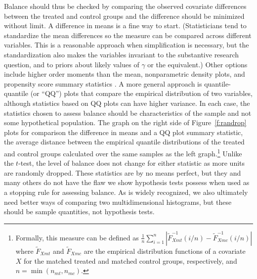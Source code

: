 \documentclass[11pt,titlepage]{article}
\begin{document}
Balance should thus be checked by comparing the observed covariate
differences between the treated and control groups and the difference
should be minimized without limit.  A difference in means is a fine
way to start.  (Statisticians tend to standardize the mean differences
so the measure can be compared across different variables.  This is a
reasonable approach when simplification is necessary, but the
standardization also makes the variables invariant to the substantive
research question, and to priors about likely values of $\gamma$ or
the equivalent.) Other options include higher order moments than the
mean, nonparametric density plots, and propensity score summary
statistics \citep{AusMam06, Hansen04, Rubin01}. A more general
approach is quantile-quantile (or ``QQ'') plots that compare the
empirical distribution of two variables, although statistics based on
QQ plots can have higher variance.  In each case, the statistics
chosen to assess balance should be characteristics of the sample and
not some hypothetical population.  The graph on the right side of
Figure~\ref{f:randrop} plots for comparison the difference in means
and a QQ plot summary statistic, the average distance between the
empirical quantile distributions of the treated and control groups
calculated over the same samples as the left graph.\footnote{Formally,
  this measure can be defined as $\frac{1}{n} \sum_{i=1}^n
  |\widetilde{F}_{Xmt}^{-1}(i/n) - \widetilde{F}^{-1}_{Xmc}(i/n)|$
  where $\widetilde{F}_{Xmt}$ and $\widetilde{F}_{Xmc}$ are the
  empirical distribution functions of a covariate $X$ for the matched
  treated and matched control groups, respectively, and
  $n=\min(n_{mt},n_{mc})$.}  Unlike the $t$-test, the level of balance
does not change for either statistic as more units are randomly
dropped.  These statistics are by no means perfect, but they and many
others do not have the flaw we show hypothesis tests possess when used
as a stopping rule for assessing balance.  As is widely recognized, we
also ultimately need better ways of comparing two multidimensional
histograms, but these should be sample quantities, not hypothesis
tests.
\end{document}
